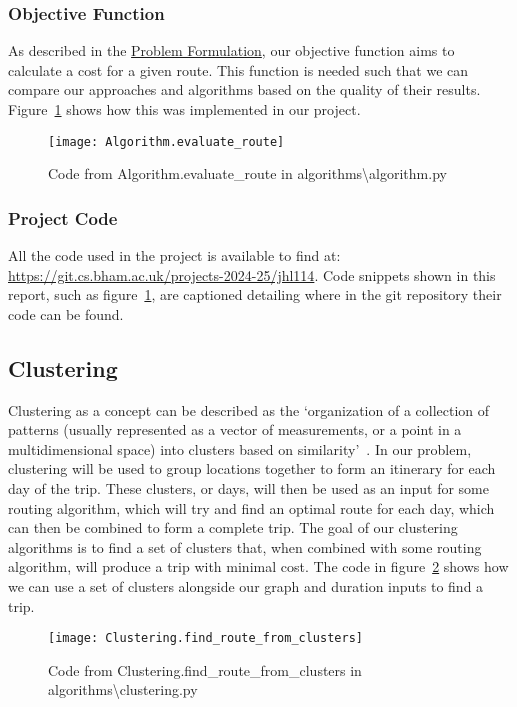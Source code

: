 \subsubsection{Objective Function}\label{subsubsec:algorithms-objective-function}
As described in the \hyperref[sec:problem-formulation]{Problem Formulation}, our objective function aims to
calculate a cost for a given route.
This function is needed such that we can compare our approaches and algorithms based on the quality of their results.
Figure~\ref{fig:Algorithm.evaluate_route} shows how this was implemented in our project.
\begin{figure}[H]
    \centering
    \texttt{[image: Algorithm.evaluate\_route]}
    \caption{Code from Algorithm.evaluate\_route in algorithms\textbackslash algorithm.py}
    \label{fig:Algorithm.evaluate_route}
\end{figure}

\subsubsection{Project Code}\label{subsubsec:project-code}
All the code used in the project is available to find at: \url{https://git.cs.bham.ac.uk/projects-2024-25/jhl114}.
Code snippets shown in this report, such as figure~\ref{fig:Algorithm.evaluate_route}, are captioned
detailing where in the git repository their code can be found.

\subsection{Clustering}\label{subsec:clustering}
Clustering as a concept can be described as the `organization of a collection of patterns (usually represented as a
vector of measurements, or a point in a multidimensional space) into clusters based on similarity'~\parencite[p. 265]{jain1999data}.
In our problem, clustering will be used to group locations together to form an itinerary for each day of the trip.
These clusters, or days, will then be used as an input for some routing algorithm, which will try and find an
optimal route for each day, which can then be combined to form a complete trip.
The goal of our clustering algorithms is to find a set of clusters that, when combined with some routing algorithm,
will produce a trip with minimal cost.
The code in figure~\ref{fig:Clustering.find_route_from_clusters} shows how we can use a set of clusters alongside our
graph and duration inputs to find a trip.
\begin{figure}[H]
    \centering
    \texttt{[image: Clustering.find\_route\_from\_clusters]}
    \caption{Code from Clustering.find\_route\_from\_clusters in algorithms\textbackslash clustering.py}
    \label{fig:Clustering.find_route_from_clusters}
\end{figure}

